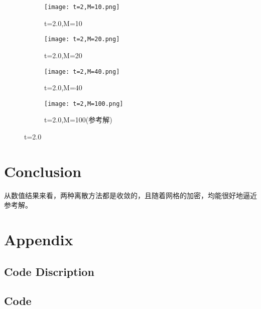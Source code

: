 \documentclass{article}
\begin{document}
\begin{figure}[H]
    \centering
    \begin{subfigure}[b]{0.47\textwidth}
        \centering
        \texttt{[image: t=2,M=10.png]}
        \caption{t=2.0,M=10}
    \end{subfigure}
    \begin{subfigure}[b]{0.47\textwidth}
        \centering
        \texttt{[image: t=2,M=20.png]}
        \caption{t=2.0,M=20}
    \end{subfigure}
    \begin{subfigure}[b]{0.47\textwidth}
        \centering
        \texttt{[image: t=2,M=40.png]}
        \caption{t=2.0,M=40}
    \end{subfigure}
    \begin{subfigure}[b]{0.47\textwidth}
        \centering
        \texttt{[image: t=2,M=100.png]}
        \caption{t=2.0,M=100(参考解)}
        
    \end{subfigure}
    \caption{t=2.0}
\end{figure}

\section{Conclusion}

从数值结果来看，两种离散方法都是收敛的，且随着网格的加密，均能很好地逼近参考解。

\section{Appendix}
\subsection{Code Discription}

\subsection{Code}

\end{document}
